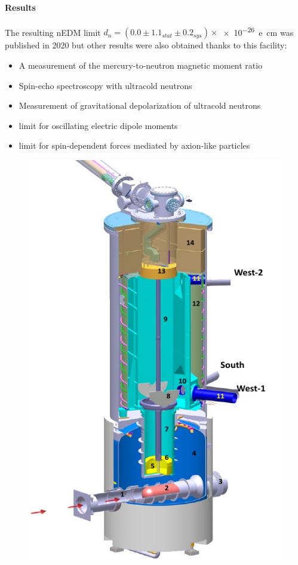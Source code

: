 \begin{refsection}
            \paragraph{Results}
            The resulting nEDM limit $d_n = (0.0 \pm 1.1_{stat}\pm0.2_{sys})\times$\SI{e-26}{e cm} was published in 2020 \cite{nEDM} but other results were also obtained thanks to this facility:
            \begin{itemize}
                \item A measurement of the mercury-to-neutron magnetic moment ratio
                \item Spin-echo spectroscopy with ultracold neutrons
                \item Measurement of gravitational depolarization of ultracold neutrons
                \item limit for oscillating electric dipole moments
                \item limit for spin-dependent forces mediated by axion-like particles
            \end{itemize}
            \begin{figure}
                \centering
                \includegraphics[scale = 0.5]{Figures/Introduction/UCN_CAD.png}

\end{figure}
\end{refsection}
